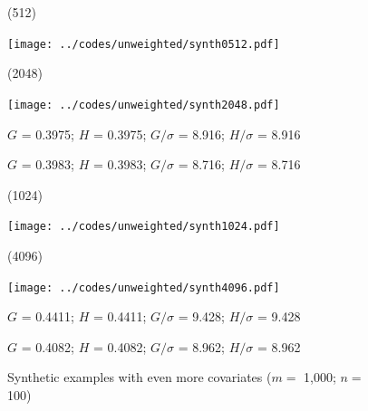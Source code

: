\documentclass{article}
\newlength{\vertsep}
\newlength{\imsize}
\newlength{\imsized}
\begin{document}
\begin{figure}
\begin{centering}
(512) \parbox{\imsize}{\texttt{[image: ../codes/unweighted/synth0512.pdf]}}
\quad
(2048) \parbox{\imsize}{\texttt{[image: ../codes/unweighted/synth2048.pdf]}}

\parbox{\imsized}{\hfil \footnotesize $G$ = 0.3975; $H$ = 0.3975;
$G/\sigma$ = 8.916; $H/\sigma$ = 8.916}
\parbox{\imsized}{\hfil \footnotesize $G$ = 0.3983; $H$ = 0.3983;
$G/\sigma$ = 8.716; $H/\sigma$ = 8.716}

\vspace{\vertsep}

(1024) \parbox{\imsize}{\texttt{[image: ../codes/unweighted/synth1024.pdf]}}
\quad
(4096) \parbox{\imsize}{\texttt{[image: ../codes/unweighted/synth4096.pdf]}}

\parbox{\imsized}{\hfil \footnotesize $G$ = 0.4411; $H$ = 0.4411;
$G/\sigma$ = 9.428; $H/\sigma$ = 9.428}
\parbox{\imsized}{\hfil \footnotesize $G$ = 0.4082; $H$ = 0.4082;
$G/\sigma$ = 8.962; $H/\sigma$ = 8.962}
\end{centering}
\caption{Synthetic examples with even more covariates ($m =$ 1,000; $n =$ 100)}
\label{synths}
\end{figure}
\end{document}
